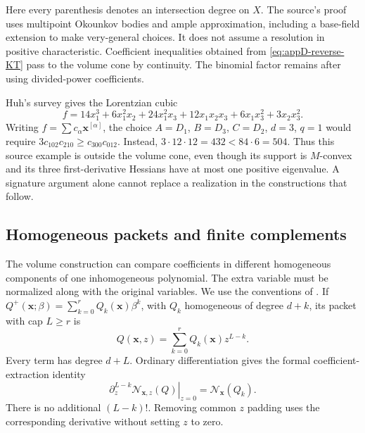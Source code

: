 Here every parenthesis denotes an intersection degree on $X$.
The source's proof uses multipoint Okounkov bodies and ample
approximation, including a base-field extension to make
very-general choices. It does not assume a resolution in positive
characteristic. Coefficient inequalities obtained from
\eqref{eq:appD-reverse-KT} pass to the volume cone by continuity.
The binomial factor remains after using divided-power coefficients.

Huh's survey \cite[Section~3, physical pp.~14--15]{Huh26VolumeSurveyV4}
gives the Lorentzian cubic
\[
 f=14x_1^3+6x_1^2x_2+24x_1^2x_3
                  +12x_1x_2x_3+6x_1x_3^2+3x_2x_3^2.
\tag{D.41}\label{eq:appD-Lorentzian-nonvolume}
\]
Writing $f=\sum c_\alpha\mathbf x^{[\alpha]}$, the choice
$A=D_1$, $B=D_3$, $C=D_2$, $d=3$, $q=1$ would require
$3c_{102}c_{210}\geq c_{300}c_{012}$. Instead,
$3\cdot12\cdot12=432<84\cdot6=504$.
Thus this source example is outside the volume cone, even though
its support is $M$-convex and its three first-derivative Hessians
have at most one positive eigenvalue. A signature argument alone
cannot replace a realization in the constructions that follow.

\subsection{Homogeneous packets and finite complements}
\label{sec:appD-Chern-packets}

The volume construction can compare coefficients in different
homogeneous components of one inhomogeneous polynomial. The extra
variable must be normalized along with the original variables. We use
the conventions of \cite[\S1.1 and \S5]{NguyenDangWang26ChernFlowV4}.
If $Q^+(\mathbf x;\beta)=\sum_{k=0}^r Q_k(\mathbf x)\beta^k$, with
$Q_k$ homogeneous of degree $d+k$, its packet with cap $L\geq r$ is
\[
 Q(\mathbf x,z)=\sum_{k=0}^r Q_k(\mathbf x)z^{L-k}.
\tag{D.42}\label{eq:appD-homogeneous-packet}
\]
Every term has degree $d+L$. Ordinary differentiation gives the
formal coefficient-extraction identity
\[
 \left.\partial_z^{L-k}\mathcal N_{\mathbf x,z}(Q)\right|_{z=0}
       =\mathcal N_{\mathbf x}(Q_k).
\tag{D.43}\label{eq:appD-packet-layer-extraction}
\]
There is no additional $(L-k)!$. Removing common $z$ padding uses
the corresponding derivative without setting $z$ to zero.

